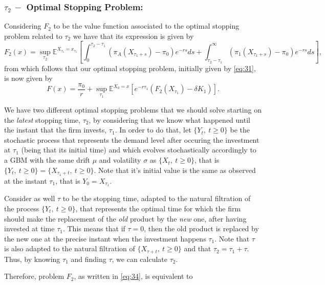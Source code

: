\subsubsection{$\tau_2 \ - $ Optimal Stopping Problem:}

Considering $F_2$ to be the value function associated to the optimal stopping problem related to $\tau_2$ we have that its expression is given by
\begin{equation}
F_2(x)=\sup_{\tau_2} \mathds{E}^{X_{\tau_1}=x_{\tau_1}} \left[ \int_0^{\tau_2-\tau_1} \left( \pi_A(X_{\tau_1+s})-\pi_0 \right) e^{-rs}ds + \int_{\tau_2-\tau_1}^\infty \left( \pi_1(X_{\tau_1+s})-\pi_0 \right) e^{-rs}ds  \right],
\label{eq:34}
\end{equation}
from which follows that our optimal stopping problem, initially given by \eqref{eq:31}, is now given by
\begin{equation}
F(x)=\frac{\pi_0}{r}+\sup _{\tau_1} \mathds{E}^{X_0=x} \left[ e^{-r \tau_1}(F_2(X_{\tau_1})-\delta K_1 )\right].
\label{eq:35}
\end{equation}

We have two different optimal stopping problems that we should solve starting on the \textit{latest} stopping time, $\tau_2$, by considering that we know what happened until the instant that the firm invests, $\tau_1$. In order to do that, let $\{Y_t, \ t\geq0\}$ be the stochastic process that represents the demand level after occuring the investment at $\tau_1$ (being that its initial time) and which evolves stochastically accordingly to a GBM with the same drift $\mu$ and volatility $\sigma$ as $\{X_t, \ t\geq0\}$, that is $\{Y_t, \ t\geq0\} = \{X_{\tau_1+t}, \ t\geq0\}$. Note that it's initial value is the same as observed at the instant $\tau_1$, that is $Y_0=X_{\tau_1}$.

Consider as well $\tau$ to be the stopping time, adapted to the natural filtration of the process $\{Y_t, \ t\geq0\}$, that represents the optimal time for which the firm should make the replacement of the \textit{old} product by the \textit{new} one, after having invested at time $\tau_1$. This means that  if $\tau=0$, then the old product is replaced by the new one at the precise instant when the investment happens $\tau_1$. Note that $\tau$ is also adapted to the natural filtration of $\{ X_{\tau+t},\ t\geq0 \}$ and that $\tau_2=\tau_1+\tau$. Thus, by knowing $\tau_1$ and finding $\tau$, we can calculate $\tau_2$.

Therefore, problem $F_2$, as written in \eqref{eq:34}, is equivalent to

